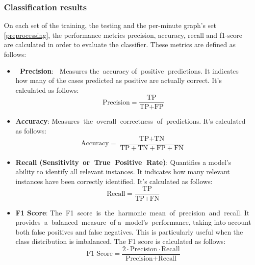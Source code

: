 \subsubsection{Classification results}
On each set of the training, the testing and the per-minute graph's set \ref{preprocessing}, the performance metrics precision, accuracy, recall and f1-score are calculated in order to evaluate the classifier. These metrics are defined as follows:
\begin{itemize}
    \item \textbf{\textcolor{white}{..}Precision}:
\textcolor{white}{..}Measures the\textcolor{white}{..}accuracy of\textcolor{white}{..}positive\textcolor{white}{..}predictions. It indicates how many of the cases predicted as positive are actually correct. It's calculated as follows:
    \begin{equation}
    \text{Precision} = \frac{\text{TP}}{\text{TP} + \text{FP}}
    \end{equation}
    \item \textbf{Accuracy}:
    Measures\textcolor{white}{..}the\textcolor{white}{..}overall\textcolor{white}{..}correctness\textcolor{white}{..}of\textcolor{white}{..}predictions. It's calculated as follows:
    \begin{equation}
    \text{Accuracy} = \frac{\text{TP} + \text{TN}}{\text{TP} + \text{TN} + \text{FP} + \text{FN}}
    \end{equation}
    \item \textbf{Recall (Sensitivity\textcolor{white}{..}or\textcolor{white}{..}True\textcolor{white}{..}Positive\textcolor{white}{..}Rate)}:
    Quantifies a model's ability to identify all relevant instances. It indicates how many relevant instances have been correctly identified. It's calculated as follows:
    \begin{equation}
    \text{Recall} = \frac{\text{TP}}{\text{TP} + \text{FN}}
    \end{equation}
    \item \textbf{F1 Score}:
    The\textcolor{white}{..}F1\textcolor{white}{..}score\textcolor{white}{..}is\textcolor{white}{..}the\textcolor{white}{..}harmonic\textcolor{white}{..}mean\textcolor{white}{..}of\textcolor{white}{..}precision\textcolor{white}{..}and\textcolor{white}{..}recall. It provides\textcolor{white}{..}a\textcolor{white}{..}balanced\textcolor{white}{..}measure\textcolor{white}{..}of a\textcolor{white}{..}model's\textcolor{white}{..}performance, taking into account both false positives and false negatives. This is particularly useful when the class distribution is imbalanced. The F1 score is calculated as follows:
    \begin{equation}
    \text{F1 Score} = \frac{2 \cdot \text{Precision} \cdot \text{Recall}}{\text{Precision} + \text{Recall}}
    \end{equation}
\end{itemize}

